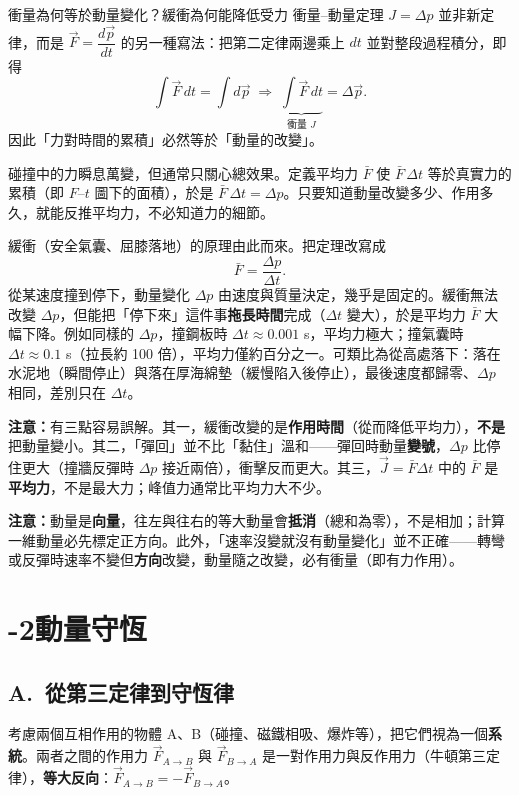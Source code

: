 \documentclass[11pt]{article}
\begin{document}
\begin{補充框}{衝量為何等於動量變化？緩衝為何能降低受力}
衝量–動量定理 $J=\Delta p$ 並非新定律，而是 $\vec F=\dfrac{d\vec p}{dt}$ 的另一種寫法：把第二定律兩邊乘上 $dt$ 並對整段過程積分，即得
$$\int\vec F\,dt=\int d\vec p \;\Longrightarrow\; \underbrace{\int\vec F\,dt}_{\text{衝量 }J}=\Delta\vec p.$$
因此「力對時間的累積」必然等於「動量的改變」。

碰撞中的力瞬息萬變，但通常只關心總效果。定義平均力 $\bar F$ 使 $\bar F\,\Delta t$ 等於真實力的累積（即 $F$–$t$ 圖下的面積），於是 $\bar F\,\Delta t=\Delta p$。只要知道動量改變多少、作用多久，就能反推平均力，不必知道力的細節。

緩衝（安全氣囊、屈膝落地）的原理由此而來。把定理改寫成
$$\bar F=\frac{\Delta p}{\Delta t}.$$
從某速度撞到停下，動量變化 $\Delta p$ 由速度與質量決定，幾乎是固定的。緩衝無法改變 $\Delta p$，但能把「停下來」這件事\textbf{拖長時間}完成（$\Delta t$ 變大），於是平均力 $\bar F$ 大幅下降。例如同樣的 $\Delta p$，撞鋼板時 $\Delta t\approx0.001$ s，平均力極大；撞氣囊時 $\Delta t\approx0.1$ s（拉長約 100 倍），平均力僅約百分之一。可類比為從高處落下：落在水泥地（瞬間停止）與落在厚海綿墊（緩慢陷入後停止），最後速度都歸零、$\Delta p$ 相同，差別只在 $\Delta t$。

\textbf{注意：}有三點容易誤解。其一，緩衝改變的是\textbf{作用時間}（從而降低平均力），\textbf{不是}把動量變小。其二，「彈回」並不比「黏住」溫和——彈回時動量\textbf{變號}，$\Delta p$ 比停住更大（撞牆反彈時 $\Delta p$ 接近兩倍），衝擊反而更大。其三，$\vec J=\bar F\Delta t$ 中的 $\bar F$ 是\textbf{平均力}，不是最大力；峰值力通常比平均力大不少。
\end{補充框}

\textbf{注意：}動量是\textbf{向量}，往左與往右的等大動量會\textbf{抵消}（總和為零），不是相加；計算一維動量必先標定正方向。此外，「速率沒變就沒有動量變化」並不正確——轉彎或反彈時速率不變但\textbf{方向}改變，動量隨之改變，必有衝量（即有力作用）。

\section*{-2\quad 動量守恆}

\subsection*{\sffamily A.\ 從第三定律到守恆律}

考慮兩個互相作用的物體 A、B（碰撞、磁鐵相吸、爆炸等），把它們視為一個\textbf{系統}。兩者之間的作用力 $\vec F_{A\to B}$ 與 $\vec F_{B\to A}$ 是一對作用力與反作用力（牛頓第三定律），\textbf{等大反向}：$\vec F_{A\to B}=-\vec F_{B\to A}$。
\end{document}
